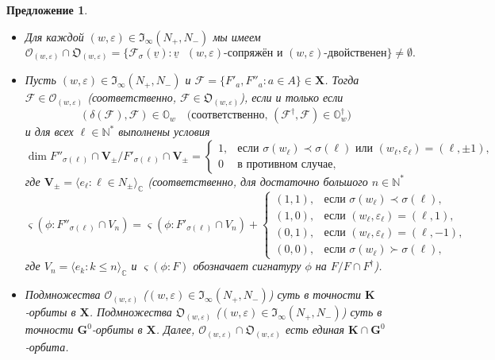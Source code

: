 \documentclass{amsart}
\newtheorem{proposition}{Предложение}
\theoremstyle{definition}
\newcommand{\NN}{\mathbb{N}^*}
\newcommand{\bs}[1]{\boldsymbol{#1}}
\begin{document}
\begin{proposition}
\label{P4.2-2}
\begin{itemize}
\item[\rm (a)] Для каждой $(w,\varepsilon)\in\mathfrak{I}_\infty(N_+,N_-)$ мы имеем
\[\bs{\mathcal{O}}_{(w,\varepsilon)}\cap\bs{\mathfrak{O}}_{(w,\varepsilon)}=\{\mathcal{F}_\sigma(\underline{v}):\mbox{$\underline{v}$  $(w,\varepsilon)$-сопряжён и $(w,\varepsilon)$-двойственен}\}\not=\emptyset.\]
\item[\rm (b)] Пусть $(w,\varepsilon)\in\mathfrak{I}_\infty(N_+,N_-)$
и $\mathcal{F}=\{F'_a,F''_a:a\in A\}\in\mathbf{X}$. Тогда
$\mathcal{F}\in\bs{\mathcal{O}}_{(w,\varepsilon)}$ (соответственно, $\mathcal{F}\in\bs{\mathfrak{O}}_{(w,\varepsilon)}$), если и только если
\[(\delta(\mathcal{F}),\mathcal{F})\in\pmb{\mathbb{O}}_w\quad\mbox{(соответственно, $(\mathcal{F}^\dag,\mathcal{F})\in\pmb{\mathbb{O}}_w^\dag$)}\]
и для всех $\ell\in\NN$ выполнены условия
\[
\dim F''_{\sigma(\ell)}\cap \mathbf{V}_\pm/F'_{\sigma(\ell)}\cap \mathbf{V}_\pm
=
\left\{\begin{array}{ll}
1, & \mbox{если $\sigma(w_\ell)\prec\sigma(\ell)$ или $(w_\ell,\varepsilon_\ell)=(\ell,\pm1)$,} \\
0 & \mbox{в противном случае,}
\end{array}\right.
\]
где $\mathbf{V}_\pm=\langle e_\ell:\ell\in N_\pm\rangle_\mathbb{C}$
(соответственно, для достаточно большого $n\in\NN$
\[
\varsigma(\phi:F''_{\sigma(\ell)}\cap V_n)=\varsigma(\phi:F'_{\sigma(\ell)}\cap V_n)+\left\{
\begin{array}{ll}
(1,1), & \mbox{если $\sigma(w_\ell)\prec\sigma(\ell)$,} \\
(1,0), & \mbox{если $(w_\ell,\varepsilon_\ell)=(\ell,1)$,} \\
(0,1), & \mbox{если $(w_\ell,\varepsilon_\ell)=(\ell,-1)$,} \\
(0,0), & \mbox{если $\sigma(w_\ell)\succ\sigma(\ell)$,}
\end{array}
\right.
\]
где
$V_n=\langle e_k:k\leq n\rangle_\mathbb{C}$
и
$\varsigma(\phi:F)$ обозначает сигнатуру $\phi$ на $F/F\cap F^\dag$).
\item[\rm (c)] Подмножества $\bs{\mathcal{O}}_{(w,\varepsilon)}$ ($(w,\varepsilon)\in\mathfrak{I}_\infty(N_+,N_-)$) суть в точности $\mathbf{K}$-орбиты в $\mathbf{X}$. Подмножества $\bs{\mathfrak{O}}_{(w,\varepsilon)}$ ($(w,\varepsilon)\in\mathfrak{I}_\infty(N_+,N_-)$) суть в точности $\mathbf{G}^0$-орбиты в $\mathbf{X}$.
Далее, $\bs{\mathcal{O}}_{(w,\varepsilon)}\cap\bs{\mathfrak{O}}_{(w,\varepsilon)}$ есть единая $\mathbf{K}\cap\mathbf{G}^0$-орбита.
\end{itemize}
\end{proposition}
\end{document}
